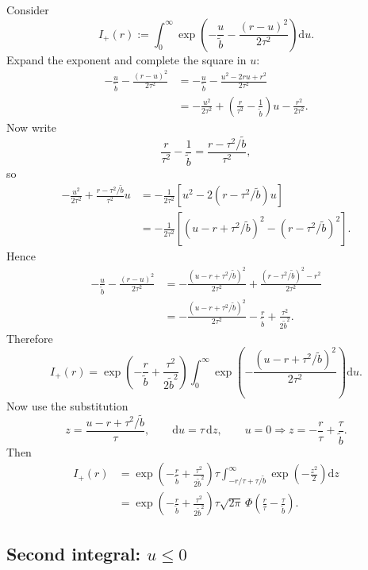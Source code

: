 \documentclass[11pt]{article}
\newcommand{\dd}{\mathrm{d}}
\newcommand{\1}{\mathbf{1}}
\newcommand{\Ph}{\Phi}
\theoremstyle{definition}
\begin{document}
Consider
\begin{equation}
I_+(r):=\int_0^{\infty} \exp\!\left(-\frac{u}{\tilde b}-\frac{(r-u)^2}{2\tau^2}\right)\dd u.
\end{equation}
Expand the exponent and complete the square in \(u\):
\begin{align}
-\frac{u}{\tilde b}-\frac{(r-u)^2}{2\tau^2}
&= -\frac{u}{\tilde b} - \frac{u^2-2ru+r^2}{2\tau^2} \\
&= -\frac{u^2}{2\tau^2} + \left(\frac{r}{\tau^2}-\frac{1}{\tilde b}\right)u - \frac{r^2}{2\tau^2}.
\end{align}
Now write
\begin{equation}
\frac{r}{\tau^2}-\frac{1}{\tilde b} = \frac{r-\tau^2/\tilde b}{\tau^2},
\end{equation}
so
\begin{align}
-\frac{u^2}{2\tau^2} + \frac{r-\tau^2/\tilde b}{\tau^2}u
&= -\frac{1}{2\tau^2}\left[u^2 - 2(r-\tau^2/\tilde b)u\right] \\
&= -\frac{1}{2\tau^2}\left[(u-r+\tau^2/\tilde b)^2 - (r-\tau^2/\tilde b)^2\right].
\end{align}
Hence
\begin{align}
-\frac{u}{\tilde b}-\frac{(r-u)^2}{2\tau^2}
&= -\frac{(u-r+\tau^2/\tilde b)^2}{2\tau^2}
+ \frac{(r-\tau^2/\tilde b)^2-r^2}{2\tau^2} \\
&= -\frac{(u-r+\tau^2/\tilde b)^2}{2\tau^2} - \frac{r}{\tilde b} + \frac{\tau^2}{2\tilde b^2}.
\end{align}
Therefore
\begin{equation}
I_+(r)=\exp\!\left(-\frac{r}{\tilde b}+\frac{\tau^2}{2\tilde b^2}\right)
\int_0^{\infty}
\exp\!\left(-\frac{(u-r+\tau^2/\tilde b)^2}{2\tau^2}\right)
\dd u.
\end{equation}
Now use the substitution
\begin{equation}
z=\frac{u-r+\tau^2/\tilde b}{\tau},
\qquad
\dd u = \tau\,\dd z,
\qquad
u=0 \Longrightarrow z = -\frac{r}{\tau}+\frac{\tau}{\tilde b}.
\end{equation}
Then
\begin{align}
I_+(r)
&= \exp\!\left(-\frac{r}{\tilde b}+\frac{\tau^2}{2\tilde b^2}\right)
\tau\int_{-r/\tau+\tau/\tilde b}^{\infty} \exp\!\left(-\frac{z^2}{2}\right)\dd z \\
&= \exp\!\left(-\frac{r}{\tilde b}+\frac{\tau^2}{2\tilde b^2}\right)
\tau\sqrt{2\pi}\, \Ph\!\left(\frac{r}{\tau}-\frac{\tau}{\tilde b}\right).
\end{align}

\subsection{Second integral: \(u\le 0\)}
\end{document}
